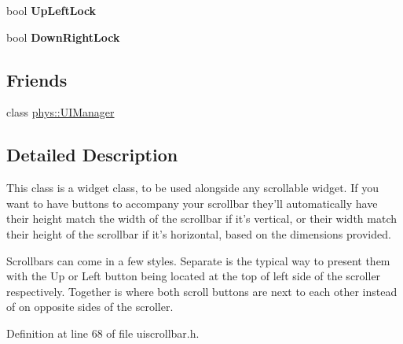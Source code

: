 \begin{DoxyCompactItemize}
\item 
\hypertarget{classphys_1_1UI_1_1Scrollbar_a10a45c7c3aad71f760b419412786eb8c}{
bool {\bfseries UpLeftLock}}
\label{d0/d3e/classphys_1_1UI_1_1Scrollbar_a10a45c7c3aad71f760b419412786eb8c}

\item 
\hypertarget{classphys_1_1UI_1_1Scrollbar_a133c6d99a33147a62826f0e0c925fcec}{
bool {\bfseries DownRightLock}}
\label{d0/d3e/classphys_1_1UI_1_1Scrollbar_a133c6d99a33147a62826f0e0c925fcec}

\end{DoxyCompactItemize}
\subsection*{Friends}
\begin{DoxyCompactItemize}
\item 
\hypertarget{classphys_1_1UI_1_1Scrollbar_a4b52bf8c4d934bf192ccfc8198b55394}{
class \hyperlink{classphys_1_1UI_1_1Scrollbar_a4b52bf8c4d934bf192ccfc8198b55394}{phys::UIManager}}
\label{d0/d3e/classphys_1_1UI_1_1Scrollbar_a4b52bf8c4d934bf192ccfc8198b55394}

\end{DoxyCompactItemize}


\subsection{Detailed Description}
This class is a widget class, to be used alongside any scrollable widget. If you want to have buttons to accompany your scrollbar they'll automatically have their height match the width of the scrollbar if it's vertical, or their width match their height of the scrollbar if it's horizontal, based on the dimensions provided. \par
 Scrollbars can come in a few styles. Separate is the typical way to present them with the Up or Left button being located at the top of left side of the scroller respectively. Together is where both scroll buttons are next to each other instead of on opposite sides of the scroller. 

Definition at line 68 of file uiscrollbar.h.



